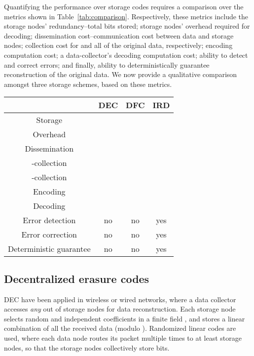 \documentclass[10pt,journal,letterpaper,compsoc]{IEEEtran}
\newcommand{\0}{{\bf 0}}
\begin{document}
Quantifying the performance over storage codes requires a comparison over the metrics shown in Table~\ref{tab:comparison}.
Respectively, these metrics include the  storage nodes' redundancy--total bits stored; storage nodes' overhead required for decoding; dissemination cost--communication cost between data and storage nodes; collection cost for  and all of the original data, respectively; encoding computation cost; a data-collector's decoding computation cost; ability to detect and correct errors; and finally, ability to deterministically guarantee reconstruction of the original data.
We now provide a qualitative comparison amongst three storage schemes, based on these metrics.
\begin{table*}[tbp]
\caption{Performance comparison of erasure coding schemes for storage}
\label{tab:comparison}
\begin{center}
\begin{tabular}{|c|c|c|c|}
\hline
& DEC & DFC & IRD\\  
\hline
\hline
Storage &  &  &  \\
Overhead &  &  & \\
\hline
Dissemination &  &  & \\
-collection &   &   & \\
-collection &   &   & \\
\hline
Encoding &  &  & \\ 
Decoding &  &  & \\
\hline
Error detection & no & no & yes\\
Error correction & no & no & yes\\
Deterministic guarantee & no & no & yes\\
\hline
\end{tabular}
\end{center}
\end{table*}


\subsection{Decentralized erasure codes}
DEC have been applied in wireless or wired networks, where a data collector accesses {\it any}  out of 
storage nodes for data reconstruction.
Each
storage node selects random and independent coefficients in a finite field
, and stores a linear combination of all the received data (modulo
). Randomized linear codes are used, where each
data node routes its packet multiple times to at least  storage nodes, so that the  storage nodes collectively store  bits.
\end{document}
